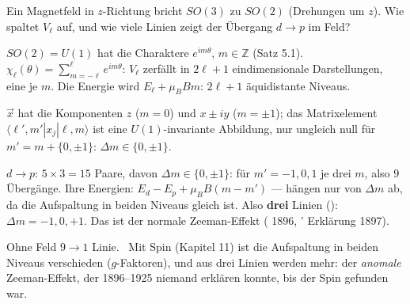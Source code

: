 \begin{aufgabe}
Ein Magnetfeld in $z$-Richtung bricht $SO(3)$ zu $SO(2)$ (Drehungen um $z$). Wie spaltet $V_\ell$ auf, und wie viele Linien zeigt der Übergang $d\to p$ im Feld?

\loesung
{}
$SO(2) = U(1)$ hat die Charaktere $e^{im\theta}$, $m\in\mathbb Z$ (Satz 5.1). $\chi_\ell(\theta) = \sum_{m = -\ell}^{\ell}e^{im\theta}$: $V_\ell$ zerfällt in $2\ell + 1$ eindimensionale Darstellungen, eine je $m$. Die Energie wird $E_\ell + \mu_BBm$: $2\ell + 1$ äquidistante Niveaus.

$\vec x$ hat die Komponenten $z$ ($m = 0$) und $x\pm iy$ ($m = \pm1$); das Matrixelement $\langle\ell', m'|x_j|\ell, m\rangle$ ist eine $U(1)$-invariante Abbildung, nur ungleich null für $m' = m + \{0, \pm1\}$: $\Delta m\in\{0, \pm1\}$.

$d\to p$: $5\times3 = 15$ Paare, davon $\Delta m\in\{0, \pm1\}$: für $m' = -1, 0, 1$ je drei $m$, also $9$ Übergänge. Ihre Energien: $E_d - E_p + \mu_BB(m - m')$ --- hängen nur von $\Delta m$ ab, da die Aufspaltung in beiden Niveaus gleich ist. Also \textbf{drei} Linien (): $\Delta m = -1, 0, +1$. Das ist der normale Zeeman-Effekt ( 1896, ' Erklärung 1897).

Ohne Feld $9\to1$ Linie. \checkmark\ Mit Spin (Kapitel 11) ist die Aufspaltung in beiden Niveaus verschieden ($g$-Faktoren), und aus drei Linien werden mehr: der \emph{anomale} Zeeman-Effekt, der 1896--1925 niemand erklären konnte, bis der Spin gefunden war.

\begin{center}
\begin{minipage}{0.88\textwidth}
\end{minipage}
\end{center}
\end{aufgabe}

